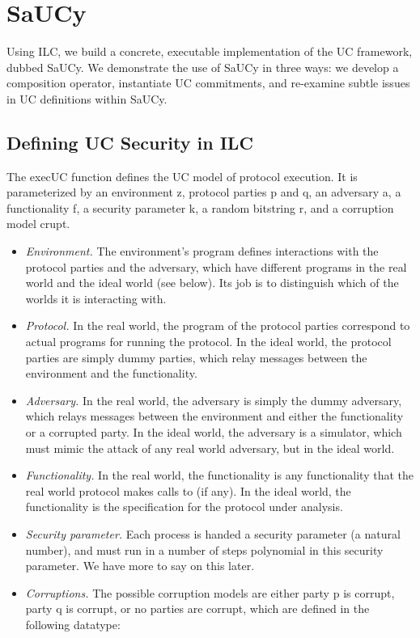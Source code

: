 \section{SaUCy}
\label{sec:saucy}

Using ILC, we build a concrete, executable implementation of the UC framework,
dubbed SaUCy. We demonstrate the use of SaUCy in three ways: we develop a
composition operator, instantiate UC commitments, and re-examine subtle issues
in UC definitions within SaUCy.

\subsection{Defining UC Security in ILC}
\label{subsec:saucy}
\label{subsec:uc}
The \textsf{execUC} function defines the UC model of protocol execution. It is
parameterized by an environment \textsf{z}, protocol parties \textsf{p} and
\textsf{q}, an adversary \textsf{a}, a functionality \textsf{f}, a security
parameter \textsf{k}, a random bitstring \textsf{r}, and a corruption model
\textsf{crupt}.

\begin{itemize}[leftmargin=*]
  \item \emph{Environment.} The environment's program defines interactions with
    the protocol parties and the adversary, which have different programs in the
    real world and the ideal world (see below). Its job is to distinguish which
    of the worlds it is interacting with.
  \item \emph{Protocol.} In the real world, the program of the protocol parties
    correspond to actual programs for running the protocol. In the ideal world,
    the protocol parties are simply dummy parties, which relay messages between
    the environment and the functionality.
  \item \emph{Adversary.} In the real world, the adversary is simply the dummy
    adversary, which relays messages between the environment and either the
    functionality or a corrupted party. In the ideal world, the adversary is a
    simulator, which must mimic the attack of any real world adversary, but in
    the ideal world.
  \item \emph{Functionality.} In the real world, the functionality is any
    functionality that the real world protocol makes calls to (if any). In the
    ideal world, the functionality is the specification for the protocol under
    analysis.
  \item \emph{Security parameter.} Each process is handed a security parameter
    (a natural number), and must run in a number of steps polynomial in this
    security parameter. We have more to say on this later.
  \item \emph{Corruptions.} The possible corruption models are either party
    \textsf{p} is corrupt, party \textsf{q} is corrupt, or no parties are
    corrupt, which are defined in the following datatype:
    
\end{itemize}

